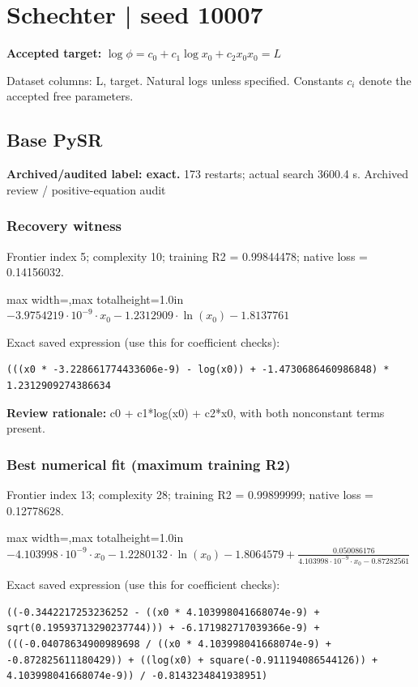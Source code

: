 \documentclass[10pt,letterpaper,landscape]{article}
\begin{document}
\section*{Schechter | seed 10007}
\textbf{Accepted target:} $\displaystyle \log\phi=c_0+c_1\log x_0+c_2x_0$\hfill $x_0=L$\par
{\small Dataset columns: L, target. Natural logs unless specified. Constants $c_i$ denote the accepted free parameters.}\par\medskip
\begin{minipage}[t]{0.485\textwidth}
\subsection*{Base PySR}
\textbf{Archived/audited label: exact.} 173 restarts; actual search 3600.4 s.
{\small Archived review / positive-equation audit}
\subsubsection*{Recovery witness}
Frontier index 5; complexity 10; training R2 = 0.99844478; native loss = 0.14156032.
\begin{center}\begin{adjustbox}{max width=\linewidth,max totalheight=1.0in}$\displaystyle - 3.9754219 \cdot 10^{-9} \cdot x_{0} - 1.2312909 \cdot \ln{\left(x_{0} \right)} - 1.8137761$\end{adjustbox}\end{center}
{\scriptsize Exact saved expression (use this for coefficient checks):}
\begin{lstlisting}
(((x0 * -3.228661774433606e-9) - log(x0)) + -1.4730686460986848) * 1.2312909274386634
\end{lstlisting}
{\small\textbf{Review rationale:} c0 + c1*log(x0) + c2*x0, with both nonconstant terms present.}
\subsubsection*{Best numerical fit (maximum training R2)}
Frontier index 13; complexity 28; training R2 = 0.99899999; native loss = 0.12778628.
\begin{center}\begin{adjustbox}{max width=\linewidth,max totalheight=1.0in}$\displaystyle - 4.103998 \cdot 10^{-9} \cdot x_{0} - 1.2280132 \cdot \ln{\left(x_{0} \right)} - 1.8064579 + \frac{0.050086176}{4.103998 \cdot 10^{-9} \cdot x_{0} - 0.87282561}$\end{adjustbox}\end{center}
{\scriptsize Exact saved expression (use this for coefficient checks):}
\begin{lstlisting}
((-0.3442217253236252 - ((x0 * 4.103998041668074e-9) + sqrt(0.19593713290237744))) + -6.171982717039366e-9) + (((-0.04078634900989698 / ((x0 * 4.103998041668074e-9) + -0.872825611180429)) + ((log(x0) + square(-0.911194086544126)) + 4.103998041668074e-9)) / -0.8143234841938951)
\end{lstlisting}
\end{minipage}\hfill
\end{document}
